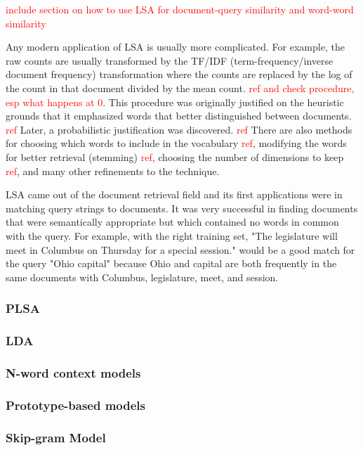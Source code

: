 \documentclass[10pt,letterpaper]{article}
\newcommand{\todo}[1]{\textcolor{red}{#1}}
\begin{document}
\todo{include section on how to use LSA for document-query similarity and word-word similarity}

Any modern application of LSA is usually more complicated. For example, the raw counts are usually transformed by the TF/IDF (term-frequency/inverse document frequency) transformation where the counts are replaced by the log of the count in that document divided by the mean count. \todo{ref and check procedure, esp what happens at 0}. This procedure was originally justified on the heuristic grounds that it emphasized words that better distinguished between documents. \todo{ref} Later, a probabilistic justification was discovered. \todo{ref} There are also methods for choosing which words to include in the vocabulary \todo{ref}, modifying the words for better retrieval (stemming) \todo{ref}, choosing the number of dimensions to keep \todo{ref}, and many other refinements to the technique.

LSA came out of the document retrieval field and its first applications were in matching query strings to documents. It was very successful in finding documents that were semantically appropriate but which contained no words in common with the query. For example, with the right training set, "The legislature will meet in Columbus on Thursday for a special session." would be a good match for the query "Ohio capital" because Ohio and capital are both frequently in the same documents with Columbus, legislature, meet, and session.

\subsubsection{PLSA}

\subsubsection{LDA}

\subsubsection{N-word context models}

\subsubsection{Prototype-based models}

\subsubsection{Skip-gram Model}
\end{document}
